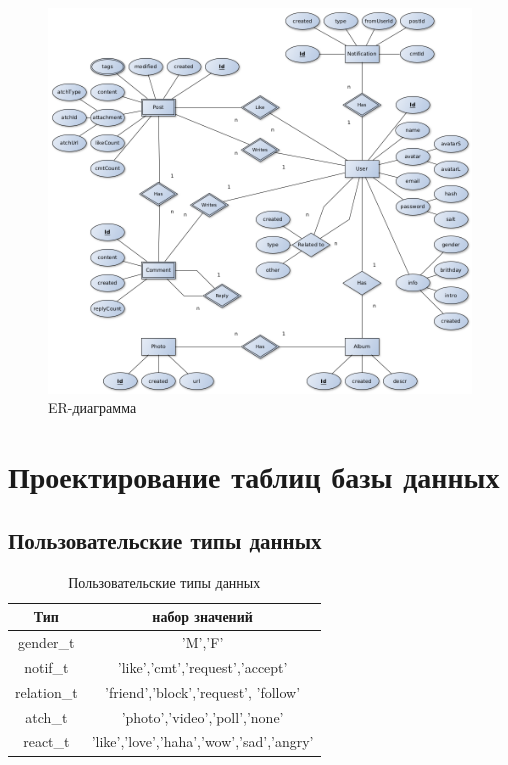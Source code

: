 \begin{figure}[ht]
  \centering
  \includegraphics[width=\textwidth]{../er.png}
  \caption{ER-диаграмма}
  \label{2.2}
\end{figure}
  

\section{Проектирование таблиц базы данных}

\subsection*{Пользовательские типы данных}

\def\arraystretch{1.3}
\setlength\tabcolsep{0.5cm}

\begin{table}[H]
  \centering
  \begin{tabular}{|c|c|}
      \hline
      \bfseries Тип  & \bfseries набор значений\\
      \hline
      gender\_t & 'M','F'\\
      notif\_t  & 'like','cmt','request','accept'\\
      relation\_t & 'friend','block','request', 'follow'\\
      atch\_t & 'photo','video','poll','none'\\
      react\_t  & 'like','love','haha','wow','sad','angry'\\
      \hline
  \end{tabular}
  \caption{Пользовательские типы данных}
\end{table}

